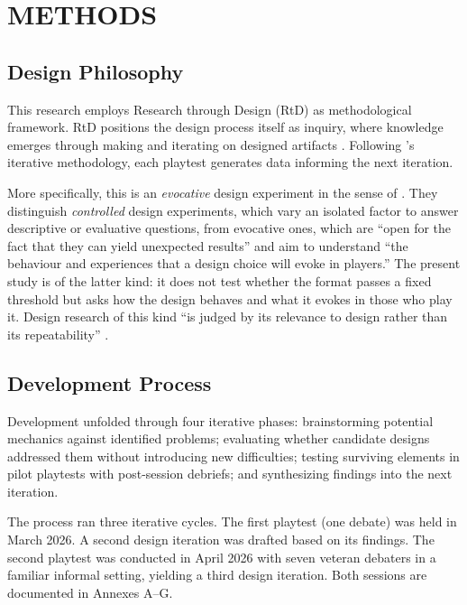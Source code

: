 \section{METHODS}
\label{sec:methods}

\subsection{Design Philosophy}

This research employs Research through Design (RtD) as methodological framework. RtD positions the design process itself as inquiry, where knowledge emerges through making and iterating on designed artifacts \parencite{coulton2017games,zimmerman2007research}. Following \textcite{zimmerman2003play}'s iterative methodology, each playtest generates data informing the next iteration.

More specifically, this is an \textit{evocative} design experiment in the sense of \textcite{waern2015experimental}. They distinguish \textit{controlled} design experiments, which vary an isolated factor to answer descriptive or evaluative questions, from evocative ones, which are ``open for the fact that they can yield unexpected results'' and aim to understand ``the behaviour and experiences that a design choice will evoke in players.'' The present study is of the latter kind: it does not test whether the format passes a fixed threshold but asks how the design behaves and what it evokes in those who play it. Design research of this kind ``is judged by its relevance to design rather than its repeatability'' \parencite{zimmerman2007research}.

\subsection{Development Process}

Development unfolded through four iterative phases: brainstorming potential mechanics against identified problems; evaluating whether candidate designs addressed them without introducing new difficulties; testing surviving elements in pilot playtests with post-session debriefs; and synthesizing findings into the next iteration.

The process ran three iterative cycles. The first playtest (one debate) was held in March 2026. A second design iteration was drafted based on its findings. The second playtest was conducted in April 2026 with seven veteran debaters in a familiar informal setting, yielding a third design iteration. Both sessions are documented in Annexes A--G.

